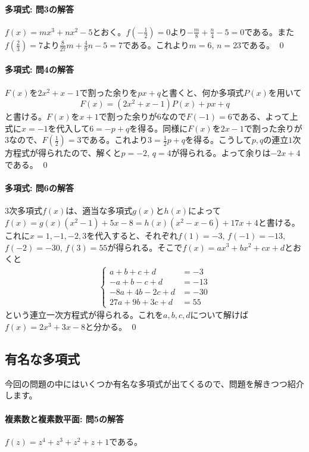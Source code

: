 \paragraph{多項式: 問3の解答}
$f(x)=mx^3+nx^2-5$とおく。$f(-\frac{1}{2})=0$より$-\frac{m}{8}+\frac{n}{4}-5=0$である。また$f(\frac{2}{3})=7$より$\frac{8}{27}m+\frac{4}{9}n-5=7$である。これより$m=6$, $n=23$である。 \qed

\paragraph{多項式: 問4の解答} 	$F(x)$を$2x^2+x-1$で割った余りを$px+q$と書くと、何か多項式$P(x)$を用いて
\[
F(x) = (2x^2+x-1)P(x) + px + q
\]
と書ける。$F(x)$を$x+1$で割った余りが$6$なので$F(-1)=6$である、よって上式に$x=-1$を代入して$6=-p+q$を得る。同様に$F(x)$を$2x-1$で割った余りが$3$なので、$F(\frac{1}{2})=3$である。これより$3=\frac{1}{2}p+q$を得る。こうして$p,q$の連立$1$次方程式が得られたので、解くと$p=-2$, $q=4$が得られる。よって余りは$-2x+4$である。 \qed

\paragraph{多項式: 問6の解答}
$3$次多項式$f(x)$は、適当な多項式$g(x)$と$h(x)$によって$f(x)=g(x)(x^2-1)+5x-8=h(x)(x^2-x-6)+17x+4$と書ける。これに$x=1,-1,-2,3$を代入すると、それぞれ$f(1)=-3$, $f(-1)=-13$, $f(-2)=-30$, $f(3)=55$が得られる。そこで$f(x)=ax^3+bx^2+cx+d$とおくと
\begin{align*}
\begin{cases}
a+b+c+d &= -3 \\
-a+b-c+d &= -13 \\
-8a+4b-2c+d &= -30 \\
27a + 9b + 3c + d &= 55
\end{cases}
\end{align*}
という連立一次方程式が得られる。これを$a,b,c,d$について解けば$f(x) = 2x^3+3x-8$と分かる。 \qed

\subsection{有名な多項式}

今回の問題の中にはいくつか有名な多項式が出てくるので、問題を解きつつ紹介します。

\paragraph{複素数と複素数平面: 問5の解答} $f(z)=z^4+z^3+z^2+z+1$である。

